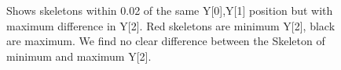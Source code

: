 \documentclass[11pt]{article} %
\begin{document}
\begin{figure}
\centering
{}%
\qquad
{}%
\caption{Shows skeletons within 0.02 of the same Y[0],Y[1] position but with maximum difference in Y[2]. Red skeletons are minimum Y[2], black are maximum. We find no clear difference between the Skeleton of minimum and maximum Y[2]. }
\label{fig:skelsZcomp}
\end{figure}
\end{document}
